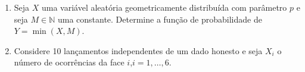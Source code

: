 \documentclass[../Notas.tex]{subfiles}
\begin{document}
\begin{enumerate}
    \begin{enumerate}[a)]
        \item Determine os valores possíveis do vetor $(X,Y)$.
        \item Determine as funções de probabilidade marginais de $X$ e $Y$.
        \item Determine a função de probabilidade conjunta de $X$ e $Y$.
        \item Calcule $P(X=Y)$, $P(X>Y)$ e $P(X+Y\leq 4)$.
    \end{enumerate}
    \begin{proof}[Solução]
        \begin{enumerate}[a)]
            \item O conjunto de valores possíveis é $\{(i,j) : i,j = 0, 1, 2, 3\}$.
            \item Temos
            \[
            p_X(x) = \begin{cases}
            1/8, x = 0,3 \\
            3/8, x = 1,2 \\
            0, \text{c.c.}
            \end{cases}, \qquad
            p_X(y) = \begin{cases}
            27/64, y = 0,1 \\
            9/64, y = 2 \\
            1/64, y = 3 \\
            0, \text{c.c.}
            \end{cases}.
            \]
            \item $p_{X,Y}(x,y) = p_X(x)p_Y(y)$.
            \item Temos 
            \[
            P(X=Y) = \sum_{k=1}^3 P(X=k)P(Y=k) = \frac{27+81+27+1}{512} = 136/512,
            \]
            \[
            P(X>Y) = \frac{81+162+63}{512} = \frac{306}{512}
            \]
            e
            \[
            P(X+Y\leq 4) = \frac{1}{8} + \frac{3}{8} + \frac{189+54}{512} = \frac{499}{512}.
            \]
        \end{enumerate}
    \end{proof}
    \item Seja $X$ uma variável aleatória geometricamente distribuída com parâmetro $p$ e seja $M\in\mathbb{N}$ uma constante. Determine a função de probabilidade de $Y = \min(X,M)$.
    \item Considere 10 lançamentos independentes de um dado honesto e seja $X_i$ o número de ocorrências da face $i$,$i=1,\dots,6$.

\end{enumerate}
\end{document}
